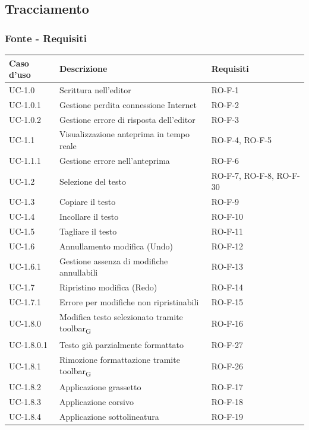 \documentclass[11pt,a4paper]{article}
\newcommand{\gls}[1]{#1\textsubscript{G}}
\begin{document}
\newpage

\subsection{Tracciamento}
\subsubsection{Fonte - Requisiti}
\begin{longtable}{|p{}|p{}|>{\raggedright\arraybackslash}p{}|}
\hline
\textbf{Caso d'uso} & \textbf{Descrizione} & \textbf{Requisiti} \\
\hline
\endhead
UC-1.0 & Scrittura nell'editor & RO-F-1 \\
\hline
UC-1.0.1 & Gestione perdita connessione Internet & RO-F-2 \\
\hline
UC-1.0.2 & Gestione errore di risposta dell'editor & RO-F-3 \\
\hline
UC-1.1 & Visualizzazione anteprima in tempo reale & RO-F-4, RO-F-5 \\
\hline
UC-1.1.1 & Gestione errore nell'anteprima & RO-F-6 \\
\hline
UC-1.2 & Selezione del testo & RO-F-7, RO-F-8, RO-F-30 \\
\hline
UC-1.3 & Copiare il testo & RO-F-9 \\
\hline
UC-1.4 & Incollare il testo & RO-F-10 \\
\hline
UC-1.5 & Tagliare il testo & RO-F-11 \\
\hline
UC-1.6 & Annullamento modifica (Undo) & RO-F-12 \\
\hline
UC-1.6.1 & Gestione assenza di modifiche annullabili & RO-F-13 \\
\hline
UC-1.7 & Ripristino modifica (Redo) & RO-F-14 \\
\hline
UC-1.7.1 & Errore per modifiche non ripristinabili & RO-F-15 \\
\hline
UC-1.8.0 & Modifica testo selezionato tramite \gls{toolbar} & RO-F-16 \\
\hline
UC-1.8.0.1 & Testo già parzialmente formattato & RO-F-27 \\
\hline
UC-1.8.1 & Rimozione formattazione tramite \gls{toolbar} & RO-F-26 \\
\hline
UC-1.8.2 & Applicazione grassetto & RO-F-17 \\
\hline
UC-1.8.3 & Applicazione corsivo & RO-F-18 \\
\hline
UC-1.8.4 & Applicazione sottolineatura & RO-F-19 \\

\end{longtable}
\end{document}
